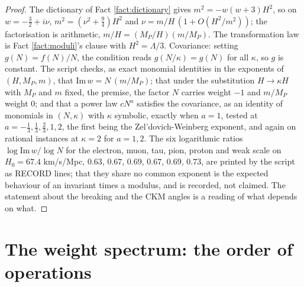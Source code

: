 \documentclass[11pt]{article}
\theoremstyle{definition}
\begin{document}
\begin{proof}
The dictionary of Fact \ref{fact:dictionary} gives $m^{2} = -w(w+3)H^{2}$, so on $w = -\tfrac32 + i\nu$, $m^{2} = (\nu^{2} + \tfrac94)H^{2}$ and $\nu = m/H\,(1 + O(H^{2}/m^{2}))$; the factorisation is arithmetic, $m/H = (M_{P}/H)(m/M_{P})$. The transformation law is Fact \ref{fact:moduli}'s clause with $H^{2} = \Lambda/3$. Covariance: setting $g(N) = f(N)/N$, the condition reads $g(N/\kappa) = g(N)$ for all $\kappa$, so $g$ is constant. The script checks, as exact monomial identities in the exponents of $(H, M_{P}, m)$, that $\mathrm{Im}\,w = N\,(m/M_{P})$; that under the substitution $H \to \kappa H$ with $M_{P}$ and $m$ fixed, the premise, the factor $N$ carries weight $-1$ and $m/M_{P}$ weight $0$; and that a power law $cN^{a}$ satisfies the covariance, as an identity of monomials in $(N, \kappa)$ with $\kappa$ symbolic, exactly when $a = 1$, tested at $a = -\tfrac13, \tfrac13, \tfrac23, 1, 2$, the first being the Zel'dovich-Weinberg exponent, and again on rational instances at $\kappa = 2$ for $a = 1, 2$. The six logarithmic ratios $\log\mathrm{Im}\,w/\log N$ for the electron, muon, tau, pion, proton and weak scale on $H_{0} = 67.4$ km/s/Mpc, $0.63$, $0.67$, $0.69$, $0.67$, $0.69$, $0.73$, are printed by the script as RECORD lines; that they share no common exponent is the expected behaviour of an invariant times a modulus, and is recorded, not claimed. The statement about the breaking and the CKM angles is a reading of what depends on what.
\end{proof}


\section{The weight spectrum: the order of operations}\label{sec:weights}
\end{document}

